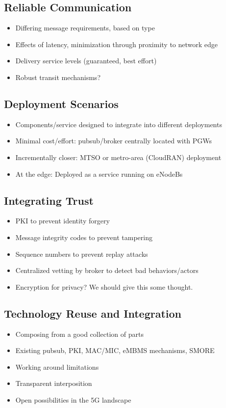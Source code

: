 \subsection{Reliable Communication}

\begin{itemize}
\item Differing message requirements, based on type
\item Effects of latency, minimization through proximity to network edge
\item Delivery service levels (guaranteed, best effort)
\item Robust transit mechanisms?
\end{itemize}

\subsection{Deployment Scenarios}

\begin{itemize}
\item Components/service designed to integrate into different deployments
\item Minimal cost/effort: pubsub/broker centrally located with PGWs
\item Incrementally closer: MTSO or metro-area (CloudRAN) deployment
\item At the edge: Deployed as a service running on eNodeBs
\end{itemize}

\subsection{Integrating Trust}

\begin{itemize}
\item PKI to prevent identity forgery
\item Message integrity codes to prevent tampering
\item Sequence numbers to prevent replay attacks
\item Centralized vetting by broker to detect bad behaviors/actors
\item Encryption for privacy? We should give this some thought.
\end{itemize}

\subsection{Technology Reuse and Integration}

\begin{itemize}
\item Composing from a good collection of parts
\item Existing pubsub, PKI, MAC/MIC, eMBMS mechanisms, SMORE
\item Working around limitations
\item Transparent interposition
\item Open possibilities in the 5G landscape
\end{itemize}
